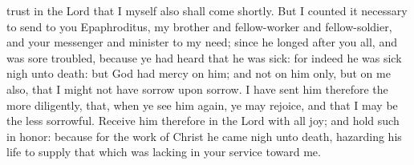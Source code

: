 trust in the Lord that I myself also shall come shortly. But I counted it necessary to send to you Epaphroditus, my brother and fellow-worker and fellow-soldier, and your messenger and minister to my need; since he longed after you all, and was sore troubled, because ye had heard that he was sick: for indeed he was sick nigh unto death: but God had mercy on him; and not on him only, but on me also, that I might not have sorrow upon sorrow. I have sent him therefore the more diligently, that, when ye see him again, ye may rejoice, and that I may be the less sorrowful. Receive him therefore in the Lord with all joy; and hold such in honor: because for the work of Christ he came nigh unto death, hazarding his life to supply that which was lacking in your service toward me. 

